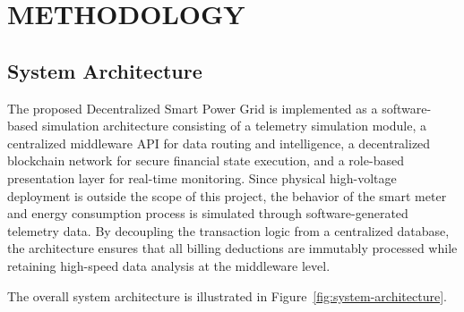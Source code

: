 \chapter{METHODOLOGY}

\section{System Architecture}

The proposed Decentralized Smart Power Grid is implemented as a software-based simulation architecture consisting of a telemetry simulation module, a centralized middleware API for data routing and intelligence, a decentralized blockchain network for secure financial state execution, and a role-based presentation layer for real-time monitoring. Since physical high-voltage deployment is outside the scope of this project, the behavior of the smart meter and energy consumption process is simulated through software-generated telemetry data. By decoupling the transaction logic from a centralized database, the architecture ensures that all billing deductions are immutably processed while retaining high-speed data analysis at the middleware level.

The overall system architecture is illustrated in Figure~\ref{fig:system-architecture}.

